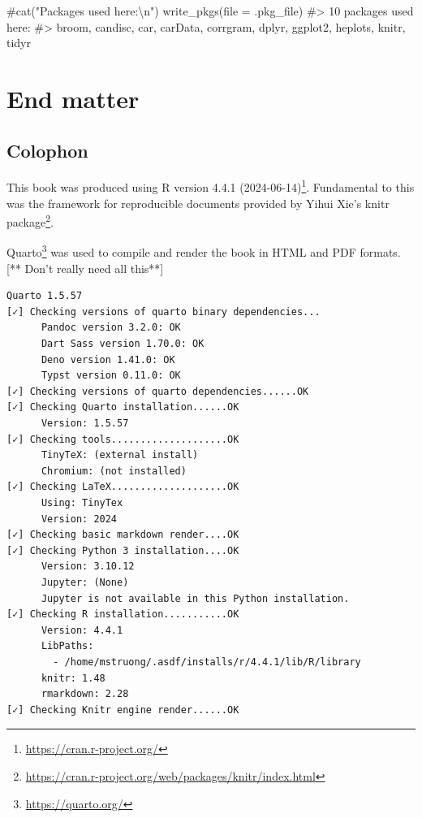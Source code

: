 \documentclass[
  letterpaper,
  10pt,
  krantz2]{krantz}
\makeatletter
\newenvironment{Shaded}{\begin{snugshade}}{\end{snugshade}}
\newcommand{\AttributeTok}[1]{\textcolor[rgb]{0.40,0.45,0.13}{#1}}
\newcommand{\CommentTok}[1]{\textcolor[rgb]{0.37,0.37,0.37}{#1}}
\newcommand{\FunctionTok}[1]{\textcolor[rgb]{0.28,0.35,0.67}{#1}}
\newcommand{\NormalTok}[1]{\textcolor[rgb]{0.00,0.23,0.31}{#1}}
\providecommand{\href}[2]{#2\footnote{\url{#1}}}
\newenvironment{kframe}{%
  \medskip{}
  \setlength{\fboxsep}{.8em}
  \def\at@end@of@kframe{}%
  \ifinner\ifhmode%
  \def\at@end@of@kframe{\end{minipage}}%
  \begin{minipage}{\columnwidth}%
  \fi\fi%
  \def\FrameCommand##1{\hskip\@totalleftmargin \hskip-\fboxsep
  \colorbox{shadecolor}{##1}\hskip-\fboxsep
      \hskip-\linewidth \hskip-\@totalleftmargin \hskip\columnwidth}%
  \MakeFramed {\advance\hsize-\width
    \@totalleftmargin\z@ \linewidth\hsize
    \@setminipage}}%
{\par\unskip\endMakeFramed%
  \at@end@of@kframe}
\renewenvironment{Shaded}{\begin{kframe}}{\end{kframe}}
\makeatother
\begin{document}
\begin{Shaded}
\begin{Highlighting}[]
\CommentTok{\#cat("Packages used here:\textbackslash{}n")}
\FunctionTok{write\_pkgs}\NormalTok{(}\AttributeTok{file =}\NormalTok{ .pkg\_file)}
\CommentTok{\#\textgreater{} 10  packages used here:}
\CommentTok{\#\textgreater{}  broom, candisc, car, carData, corrgram, dplyr, ggplot2, heplots, knitr, tidyr}
\end{Highlighting}
\end{Shaded}

\part{End matter}

\chapter*{Colophon}\label{colophon}


This book was produced using \href{https://cran.r-project.org/}{R
version 4.4.1 (2024-06-14)}. Fundamental to this was the framework for
reproducible documents provided by Yihui Xie's
\href{https://cran.r-project.org/web/packages/knitr/index.html}{knitr
package}.

\href{https://quarto.org/}{Quarto} was used to compile and render the
book in HTML and PDF formats. {[}** Don't really need all this**{]}

\begin{verbatim}
Quarto 1.5.57
[✓] Checking versions of quarto binary dependencies...
      Pandoc version 3.2.0: OK
      Dart Sass version 1.70.0: OK
      Deno version 1.41.0: OK
      Typst version 0.11.0: OK
[✓] Checking versions of quarto dependencies......OK
[✓] Checking Quarto installation......OK
      Version: 1.5.57
[✓] Checking tools....................OK
      TinyTeX: (external install)
      Chromium: (not installed)
[✓] Checking LaTeX....................OK
      Using: TinyTex
      Version: 2024
[✓] Checking basic markdown render....OK
[✓] Checking Python 3 installation....OK
      Version: 3.10.12
      Jupyter: (None)
      Jupyter is not available in this Python installation.
[✓] Checking R installation...........OK
      Version: 4.4.1
      LibPaths:
        - /home/mstruong/.asdf/installs/r/4.4.1/lib/R/library
      knitr: 1.48
      rmarkdown: 2.28
[✓] Checking Knitr engine render......OK
\end{verbatim}
\end{document}
